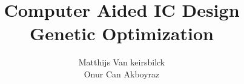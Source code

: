 \documentclass[a4paper,12pt]{article}
\begin{document}
	
\title{\LARGE {\bf Computer Aided IC Design \\ Genetic Optimization}\\
 \vspace*{6mm}
}
\author{Matthijs Van keirsbilck \\ Onur Can Akboyraz }
\submitdate{\today}

\maketitle %

\tableofcontents
\clearpage
{}






\end{document}
